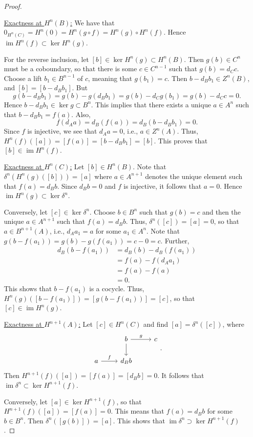 \documentclass[10pt,letterpaper,cm]{nupset}
\theoremstyle{definition}
\theoremstyle{theorem}
\theoremstyle{remark}
\newcommand{\1}{\mathbf{1}}
\newcommand{\0}{\vec 0}
\DeclareMathOperator{\im}{im}
\begin{document}
\begin{proof} $ $

\smallskip

\underline{Exactness at $H^n(B)$:}
We have that $0_{H^n(C)} = H^n(0) = H^n(g \circ f) = H^n(g) \circ H^n(f)$. Hence $\im{H^n(f)} \subset \ker{H^n(g)}$.

For the reverse inclusion, let $[b] \in \ker{H^n(g)} \subset H^n(B)$. Then $g(b) \in C^n$ must be a coboundary, so that there is some $c\in C^{n-1}$ such that $g(b) = d_C{c}$. Choose a lift $b_1 \in B^{n-1}$ of $c$, meaning that $g(b_1) = c$. Then $b -  d_B{b_1} \in Z^n(B)$, and $[b] = [b - d_B{b_1}]$. But $$g(b - d_B{b_1}) = g(b) - g(d_B{b_1}) = g(b) - d_C{g(b_1)} = g(b) - d_C{c} =0.$$ Hence $b - d_B{b_1} \in \ker{g} \subset B^n$. This implies that there exists a unique $a \in A^n$ such that $b- d_B{b_1} = f(a)$. Also, $$   f(d_A{a}) = d_B(f(a)) = d_B(b-d_B{b_1}) = 0   .$$ Since $f$ is injective, we see that $d_A{a} =0$, i.e., $a \in Z^n(A)$. Thus, $H^n(f)([a]) = [f(a)] = [b-d_B{b_1}] = [b]$. This proves that $[b] \in \im{H^n(f)}$.

\medskip


\underline{Exactness at $H^n(C)$:} Let $[b] \in H^n(B)$. Note that $\delta^n(H^n(g)([b])) = [a]$ where $a\in A^{n+1}$ denotes the unique element such that $f(a) = d_B{b} $. Since $d_B{b} =0$ and $f$ is injective, it follows that $a=0$. Hence $\im{H^n(g)}\subset \ker{\delta^n}$.  

Conversely, let $[c] \in \ker{\delta^n}$. Choose $b\in B^n$ such that $g(b) =c$ and then the unique $a\in A^{n+1}$ such that $f(a) = d_B{b}$. Thus, $\delta^n([c]) =[a] =0$, so that $a\in B^{n+1}(A)$, i.e., $d_A{a_1} =a$ for some $a_1 \in A^n$. Note that $g(b-f(a_1))= g(b) -g(f(a_1)) = c -0 =c$. Further, 
\begin{align*}
d_B(b-f(a_1)) & = d_B(b) - d_B(f(a_1))
\\ & = f(a) - f(d_A{a_1})
\\ & = f(a) - f(a)
\\ & =0.
\end{align*} 
This shows that $b-f(a_1)$ is a cocycle. Thus, $H^n(g)([b-f(a_1)]) = [g(b- f(a_1))] = [c]$, so that $[c] \in \im{H^n(g)}$. 

\medskip


\underline{Exactness at $H^{n+1}(A)$:} Let $[c] \in H^n(C)$ and find $[a] = \delta^n([c])$, where
\[
\begin{tikzcd}
                 & b \arrow[d] \arrow[r, "g"] & c \\
a \arrow[r, "f"] & d_B{b}                     &  
\end{tikzcd}
.\] 
Then $H^{n+1}(f)([a]) = [f(a)] = [d_B{b}] =0$. It follows that $\im{\delta^n} \subset \ker{H^{n+1}(f)}$.

Conversely, let $[a] \in  \ker{H^{n+1}(f)}$, so that $H^{n+1}(f)([a]) = [f(a)]= 0$. This means that $f(a) = d_B{b}$ for some $b \in B^n$. Then $\delta^n([g(b)]) = [a]$. This shows that $\im{\delta^n} \supset \ker{H^{n+1}(f)}$.
\end{proof}
\end{document}
